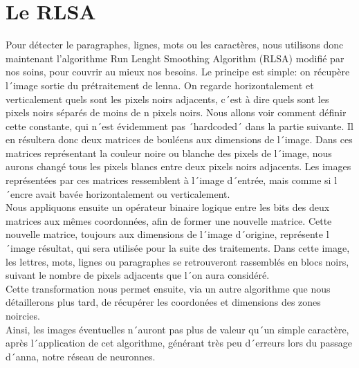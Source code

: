 \section{Le RLSA}

Pour détecter le paragraphes, lignes, mots ou les caractères, nous utilisons donc maintenant l'algorithme Run Lenght Smoothing Algorithm (RLSA) modifié par nos soins, pour couvrir au mieux nos besoins. Le principe est simple: on récupère l´image sortie du prétraitement de lenna. On regarde horizontalement et verticalement quels sont les pixels noirs adjacents, c´est à dire quels sont les pixels noirs séparés de moins de n pixels noirs. Nous allons voir comment définir cette constante, qui n´est évidemment pas ´hardcoded´ dans la partie suivante. Il en résultera donc deux matrices de bouléens aux dimensions de l´image. Dans ces matrices représentant la couleur noire ou blanche des pixels de l´image, nous aurons changé tous les pixels blancs entre deux pixels noirs adjacents. Les images représentées par ces matrices ressemblent à l´image d´entrée, mais comme si l´encre avait bavée horizontalement ou verticalement.\\
Nous appliquons ensuite un opérateur binaire logique entre les bits des deux matrices aux mêmes coordonnées, afin de former une nouvelle matrice. Cette nouvelle matrice, toujours aux dimensions de l´image d´origine, représente l´image résultat, qui sera utilisée pour la suite des traitements. Dans cette image, les lettres, mots, lignes ou paragraphes se retrouveront rassemblés en blocs noirs, suivant le nombre de pixels adjacents que l´on aura considéré.\\
Cette transformation nous permet ensuite, via un autre algorithme que nous détaillerons plus tard, de récupérer les coordonées et dimensions des zones noircies.\\
Ainsi, les images éventuelles n´auront pas plus de valeur qu´un simple caractère, après l´application de cet algorithme, générant très peu d´erreurs lors du passage d´anna, notre réseau de neuronnes.

